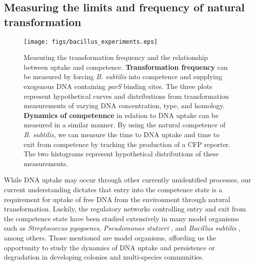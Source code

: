 \subsection*{Measuring the limits and frequency of natural transformation}
\begin{figure}
	\centerline{\texttt{[image: figs/bacillus\_experiments.eps]}}

	\caption{
		Measuring the transformation frequency and the relationship
		between uptake and competence. \textbf{Transformation frequency}
		can be measured by forcing \textit{B. subtilis} into competence
		and supplying exogenous DNA containing \textit{parS} binding
		sites. The three plots represent hypothetical curves and
		distributions from transformation measurements of varying DNA
		concentration, type, and homology. \textbf{Dynamics of
		competennce} in relation to DNA uptake can be measured in a
		similar manner. By using the natural competence of \textit{B.
		subtilis}, we can measure the time to DNA uptake and time to
		exit from competence by tracking the production of a CFP
		reporter. The two histograms represent hypothetical
		distributions of these measurements.}
	\label{fig:transformation_exp} 

\end{figure}

While DNA uptake may occur through other currently unidentified processes, our
current understanding dictates that entry into the competence state is a
requirement for uptake of free DNA from the environment through natural
transformation. Luckily, the regulatory networks controlling entry and exit from
the competence state have been studied extensively in many model organisms such
as \textit{Streptococcus pyogoenes}\cite{Woodbury:2006dg}, \textit{Pseudomonas
stutzeri} \cite{Graupner:2001ii}, and \textit{Bacillus subtilis}
\cite{Suel:2006ea,Suel:2007dm}, among others.  Those mentioned are model
organisms, affording us the opportunity to study the dynamics of DNA uptake and
persistence or degradation in developing colonies and multi-species communities.

